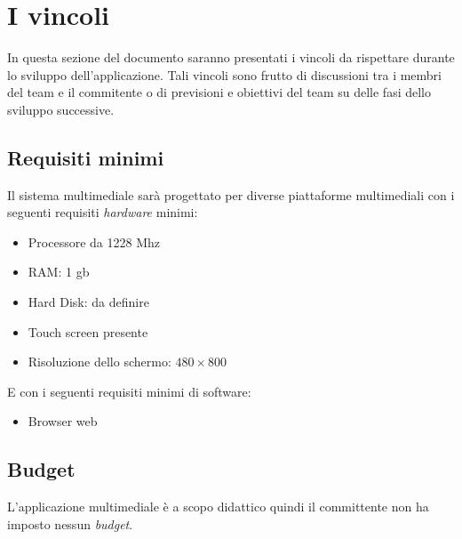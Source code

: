 \section{I vincoli}
In questa sezione del documento saranno presentati i vincoli da rispettare durante lo sviluppo dell'applicazione. Tali vincoli sono frutto di discussioni tra i membri del team e il commitente o di previsioni e obiettivi del team su delle fasi dello sviluppo successive.

\subsection{Requisiti minimi}
Il sistema multimediale sarà progettato per diverse piattaforme multimediali con i seguenti requisiti \emph{hardware} minimi:
\begin{itemize}
	\item Processore da 1228 Mhz
	\item RAM: 1 gb
	\item Hard Disk: da definire
	\item Touch screen presente
	\item Risoluzione dello schermo: $480 \times 800$
\end{itemize}
E con i seguenti requisiti minimi di software:
\begin{itemize}
	\item Browser web
\end{itemize}

\subsection{Budget}
L'applicazione multimediale è a scopo didattico quindi il committente non ha imposto nessun \emph{budget}.